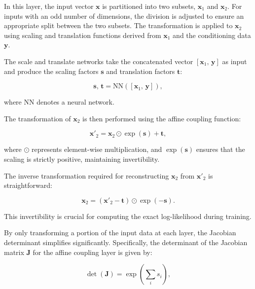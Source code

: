 \documentclass[11pt]{paper}
\begin{document}
In this layer, the input vector $\mathbf{x}$ is partitioned into two subsets, $\mathbf{x}_1$ and $\mathbf{x}_2$. For inputs with an odd number of dimensions, the division is adjusted to ensure an appropriate split between the two subsets. The transformation is applied to $\mathbf{x}_2$ using scaling and translation functions derived from $\mathbf{x}_1$ and the conditioning data $\mathbf{y}$.

The scale and translate networks take the concatenated vector $[\mathbf{x}_1,\, \mathbf{y}]$ as input and produce the scaling factors $\mathbf{s}$ and translation factors $\mathbf{t}$:

\begin{equation}
\mathbf{s},\, \mathbf{t} = \text{NN}([\mathbf{x}_1,\, \mathbf{y}]),
\label{eq:scale_translate}
\end{equation}

where $\text{NN}$ denotes a neural network.

The transformation of $\mathbf{x}_2$ is then performed using the affine coupling function:

\begin{equation}
\mathbf{x}'_2 = \mathbf{x}_2 \odot \exp(\mathbf{s}) + \mathbf{t},
\label{eq:affine_transformation}
\end{equation}

where $\odot$ represents element-wise multiplication, and $\exp(\mathbf{s})$ ensures that the scaling is strictly positive, maintaining invertibility.

The inverse transformation required for reconstructing $\mathbf{x}_2$ from $\mathbf{x}'_2$ is straightforward:

\begin{equation}
\mathbf{x}_2 = (\mathbf{x}'_2 - \mathbf{t}) \odot \exp(-\mathbf{s}).
\label{eq:inverse_affine_transformation}
\end{equation}

This invertibility is crucial for computing the exact log-likelihood during training.

By only transforming a portion of the input data at each layer, the Jacobian determinant simplifies significantly. Specifically, the determinant of the Jacobian matrix $\mathbf{J}$ for the affine coupling layer is given by:

\begin{equation}
\det(\mathbf{J}) = \exp\left( \sum_{i} s_i \right),
\label{eq:jacobian_determinant}
\end{equation}
\end{document}
